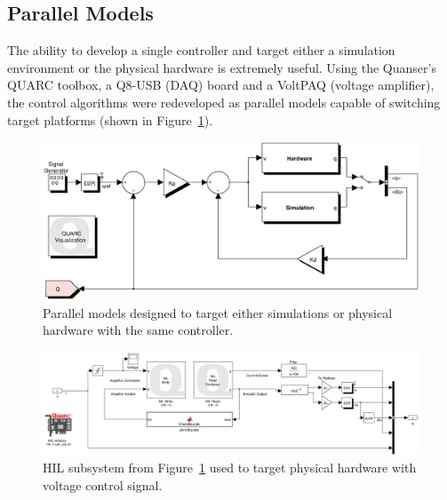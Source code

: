 \subsection{Parallel Models} %
\label{sub:parallel_models}

The ability to develop a single controller and target either a simulation environment or the physical hardware is extremely useful. Using the Quanser's QUARC toolbox, a Q8-USB (DAQ) board and a VoltPAQ (voltage amplifier), the control algorithms were redeveloped as parallel models capable of switching target platforms (shown in Figure~\ref{fig:parallelmodels}).

\begin{figure}[!t]
	\centering
    \includegraphics[scale=0.6]{fig/experiments/parallelmodels.eps} 
  	\caption{Parallel models designed to target either simulations or physical hardware with the same controller.}
	\label{fig:parallelmodels}
\end{figure}

\begin{figure}[!b]
	\centering
    \includegraphics[scale=0.45]{fig/experiments/hilmodel.eps} 
  	\caption{HIL subsystem from Figure~\ref{fig:parallelmodels} used to target physical hardware with voltage control signal.}
	\label{fig:hilmodel}
\end{figure}

